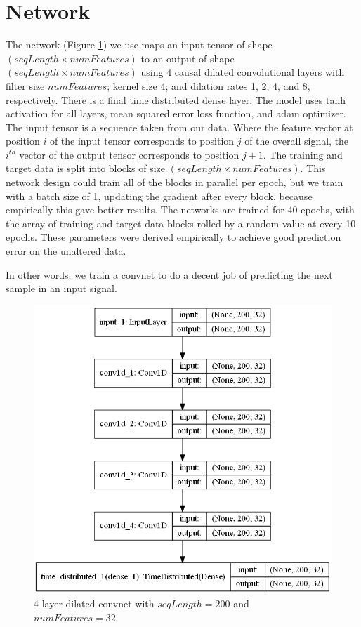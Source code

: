 \documentclass{acm_proc_article-sp}
\begin{document}
  \section{Network}
  \label{sec:network}
  
  The network (Figure \ref{fig.model}) we use maps an input tensor of shape \((seqLength \times numFeatures)\) to an output of shape \((seqLength \times numFeatures)\) using 4 causal dilated convolutional layers with filter size \(numFeatures\); kernel size 4; and dilation rates 1, 2, 4, and 8, respectively. There is a final time distributed dense layer. The model uses tanh activation for all layers, mean squared error loss function, and adam optimizer. The input tensor is a sequence taken from our data. Where the feature vector at position \(i\) of the input tensor corresponds to position \(j\) of the overall signal, the \(i^{th}\) vector of the output tensor corresponds to position \(j+1\). The training and target data is split into blocks of size \((seqLength \times numFeatures)\). This network design could train all of the blocks in parallel per epoch, but we train with a batch size of 1, updating the gradient after every block, because empirically this gave better results. The networks are trained for 40 epochs, with the array of training and target data blocks rolled by a random value at every 10 epochs. These parameters were derived empirically to achieve good prediction error on the unaltered data. 
  
  In other words, we train a convnet to do a decent job of predicting the next sample in an input signal.

  \begin{figure}[h]
    \centering
    \includegraphics[width=0.8\columnwidth]{images/model.png}
    \caption{4 layer dilated convnet with \(seqLength=200\) and \(numFeatures=32\).}
    \label{fig.model}
    \end{figure}
  
\end{document}
